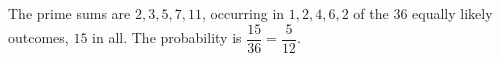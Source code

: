 The prime sums are $2,3,5,7,11$, occurring in $1,2,4,6,2$ of the $36$ equally likely outcomes, $15$ in all. The probability is $\dfrac{15}{36}=\boxed{\dfrac{5}{12}}$.
